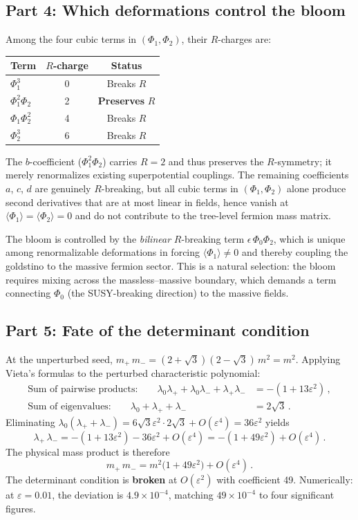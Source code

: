 \documentclass[12pt]{article}
\begin{document}
\subsection*{Part 4: Which deformations control the bloom}

Among the four cubic terms in $(\Phi_1, \Phi_2)$, their $R$-charges are:
\begin{center}
\begin{tabular}{lcc}
Term & $R$-charge & Status \\\hline
$\Phi_1^3$ & 0 & Breaks $R$ \\
$\Phi_1^2\Phi_2$ & 2 & \textbf{Preserves} $R$ \\
$\Phi_1\Phi_2^2$ & 4 & Breaks $R$ \\
$\Phi_2^3$ & 6 & Breaks $R$
\end{tabular}
\end{center}
The $b$-coefficient ($\Phi_1^2\Phi_2$) carries $R = 2$ and thus preserves the $R$-symmetry; it merely renormalizes existing superpotential couplings. The remaining coefficients $a$, $c$, $d$ are genuinely $R$-breaking, but all cubic terms in $(\Phi_1, \Phi_2)$ alone produce second derivatives that are at most linear in fields, hence vanish at $\langle\Phi_1\rangle = \langle\Phi_2\rangle = 0$ and do not contribute to the tree-level fermion mass matrix.

The bloom is controlled by the \emph{bilinear} $R$-breaking term $\epsilon\,\Phi_0\Phi_2$, which is unique among renormalizable deformations in forcing $\langle\Phi_1\rangle \neq 0$ and thereby coupling the goldstino to the massive fermion sector. This is a natural selection: the bloom requires mixing across the massless--massive boundary, which demands a term connecting $\Phi_0$ (the SUSY-breaking direction) to the massive fields.

\subsection*{Part 5: Fate of the determinant condition}

At the unperturbed seed, $m_+\, m_- = (2+\sqrt{3})(2-\sqrt{3})\,m^2 = m^2$. Applying Vieta's formulas to the perturbed characteristic polynomial:
\begin{align*}
\text{Sum of pairwise products:}\qquad \lambda_0\lambda_+ + \lambda_0\lambda_- + \lambda_+\lambda_- &= -(1 + 13\varepsilon^2)\,,\\
\text{Sum of eigenvalues:}\qquad \lambda_0 + \lambda_+ + \lambda_- &= 2\sqrt{3}\,.
\end{align*}
Eliminating $\lambda_0({\lambda_+ + \lambda_-}) = 6\sqrt{3}\varepsilon^2 \cdot 2\sqrt{3} + O(\varepsilon^4) = 36\varepsilon^2$ yields
$$
\lambda_+\,\lambda_- = -(1 + 13\varepsilon^2) - 36\varepsilon^2 + O(\varepsilon^4) = -(1 + 49\varepsilon^2) + O(\varepsilon^4)\,.
$$
The physical mass product is therefore
$$
m_+\,m_- = m^2\bigl(1 + 49\varepsilon^2\bigr) + O(\varepsilon^4)\,.
$$
The determinant condition is \textbf{broken} at $O(\varepsilon^2)$ with coefficient 49. Numerically: at $\varepsilon = 0.01$, the deviation is $4.9 \times 10^{-4}$, matching $49 \times 10^{-4}$ to four significant figures.
\end{document}
